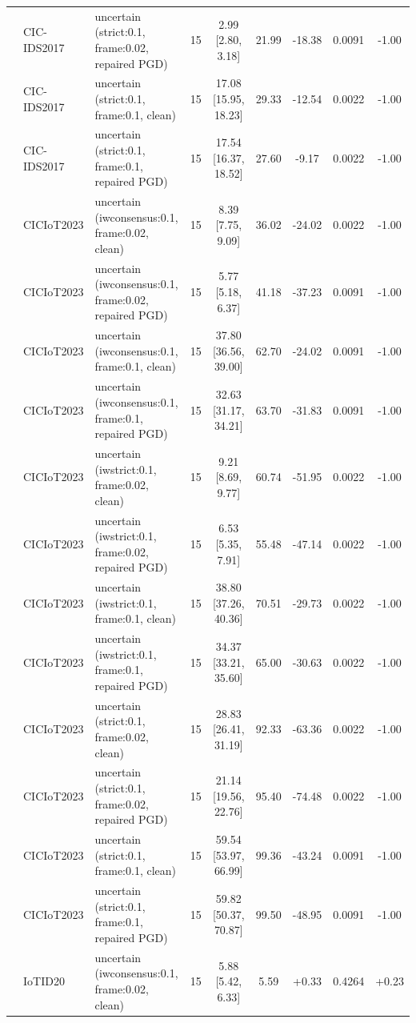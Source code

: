 \begin{table}[t]
\begin{tabular}{lllcccccc}
 & CIC-IDS2017 & uncertain (strict:0.1, frame:0.02, repaired PGD) & 15 & 2.99 [2.80, 3.18] & 21.99 & -18.38 & 0.0091 & -1.00 \\
 & CIC-IDS2017 & uncertain (strict:0.1, frame:0.1, clean) & 15 & 17.08 [15.95, 18.23] & 29.33 & -12.54 & 0.0022 & -1.00 \\
 & CIC-IDS2017 & uncertain (strict:0.1, frame:0.1, repaired PGD) & 15 & 17.54 [16.37, 18.52] & 27.60 & -9.17 & 0.0022 & -1.00 \\
 & CICIoT2023 & uncertain (iwconsensus:0.1, frame:0.02, clean) & 15 & 8.39 [7.75, 9.09] & 36.02 & -24.02 & 0.0022 & -1.00 \\
 & CICIoT2023 & uncertain (iwconsensus:0.1, frame:0.02, repaired PGD) & 15 & 5.77 [5.18, 6.37] & 41.18 & -37.23 & 0.0091 & -1.00 \\
 & CICIoT2023 & uncertain (iwconsensus:0.1, frame:0.1, clean) & 15 & 37.80 [36.56, 39.00] & 62.70 & -24.02 & 0.0091 & -1.00 \\
 & CICIoT2023 & uncertain (iwconsensus:0.1, frame:0.1, repaired PGD) & 15 & 32.63 [31.17, 34.21] & 63.70 & -31.83 & 0.0091 & -1.00 \\
 & CICIoT2023 & uncertain (iwstrict:0.1, frame:0.02, clean) & 15 & 9.21 [8.69, 9.77] & 60.74 & -51.95 & 0.0022 & -1.00 \\
 & CICIoT2023 & uncertain (iwstrict:0.1, frame:0.02, repaired PGD) & 15 & 6.53 [5.35, 7.91] & 55.48 & -47.14 & 0.0022 & -1.00 \\
 & CICIoT2023 & uncertain (iwstrict:0.1, frame:0.1, clean) & 15 & 38.80 [37.26, 40.36] & 70.51 & -29.73 & 0.0022 & -1.00 \\
 & CICIoT2023 & uncertain (iwstrict:0.1, frame:0.1, repaired PGD) & 15 & 34.37 [33.21, 35.60] & 65.00 & -30.63 & 0.0022 & -1.00 \\
 & CICIoT2023 & uncertain (strict:0.1, frame:0.02, clean) & 15 & 28.83 [26.41, 31.19] & 92.33 & -63.36 & 0.0022 & -1.00 \\
 & CICIoT2023 & uncertain (strict:0.1, frame:0.02, repaired PGD) & 15 & 21.14 [19.56, 22.76] & 95.40 & -74.48 & 0.0022 & -1.00 \\
 & CICIoT2023 & uncertain (strict:0.1, frame:0.1, clean) & 15 & 59.54 [53.97, 66.99] & 99.36 & -43.24 & 0.0091 & -1.00 \\
 & CICIoT2023 & uncertain (strict:0.1, frame:0.1, repaired PGD) & 15 & 59.82 [50.37, 70.87] & 99.50 & -48.95 & 0.0091 & -1.00 \\
 & IoTID20 & uncertain (iwconsensus:0.1, frame:0.02, clean) & 15 & 5.88 [5.42, 6.33] & 5.59 & +0.33 & 0.4264 & +0.23 \\

\end{tabular}
\end{table}

